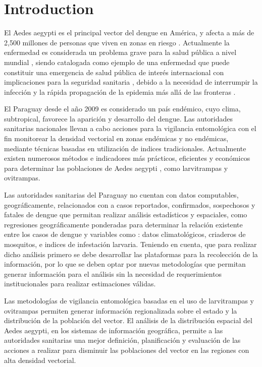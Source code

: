 \section{Introduction}
El Aedes aegypti es el principal vector del dengue en América, y afecta a más de 2,500 millones
de personas que viven en zonas en riesgo \cite{world2009dengue, gustavo2006dengue}. Actualmente la enfermedad es considerada un problema grave para la salud pública a nivel mundial
\cite{dengueUruguayCap1, world2009dengue, DIBO2005}, siendo catalogada como ejemplo de una
enfermedad que puede constituir una emergencia de salud pública de interés internacional con
implicaciones para la seguridad sanitaria \cite{dengueUruguayCap1, world2009dengue}, debido a la
necesidad de interrumpir la infección y la rápida propagación de la epidemia más allá de las
fronteras \cite{world2009dengue}.

El Paraguay desde el año 2009 es considerado un país endémico, cuyo clima, subtropical, favorece
la aparición y desarrollo del dengue. Las autoridades sanitarias nacionales llevan a cabo
acciones para la vigilancia entomológica con el fin monitorear la densidad vectorial en zonas
endémicas y no endémicas, mediante técnicas basadas en utilización de indices tradicionales.
Actualmente existen numerosos métodos e indicadores más prácticos, eficientes y económicos para
determinar las poblaciones de Aedes aegypti \cite{cenaprece2013}, como larvitrampas y ovitrampas.

Las autoridades sanitarias del Paraguay no cuentan con datos computables, geográficamente,
relacionados con a casos reportados, confirmados, sospechosos y fatales de dengue que permitan
realizar análisis estadísticos y espaciales, como regresiones geográficamente ponderadas para
determinar la relación existente entre los casos de dengue y variables como : datos
climatológicos, criaderos de mosquitos, e indices de infestación larvaria. Teniendo en cuenta,
que para realizar dicho análisis primero se debe desarrollar las plataformas para la recolección
de la información, por lo que se deben optar por nuevas metodologías que permitan generar
información para el análisis sin la necesidad de requerimientos institucionales para realizar
estimaciones válidas.

Las metodologías de vigilancia entomológica basadas en el uso de larvitrampas y ovitrampas
permiten generar información regionalizada sobre el estado y la distribución de la población del
vector. El análisis de la distribución espacial del Aedes aegypti, en los sistemas de información
geográfica, permite a las autoridades sanitarias una mejor definición, planificación y evaluación
de las acciones a realizar para disminuir las poblaciones del vector en las regiones con alta
densidad vectorial.
